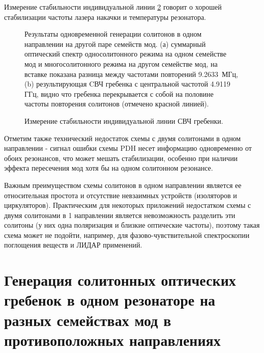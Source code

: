 Измерение стабильности индивидуальной линии \ref{single_line_stability_cp} говорит о хорошей стабилизации частоты лазера накачки и температуры резонатора.

\begin{figure}[ht]
\begin{minipage}[ht]{1\linewidth}
\end{minipage}
\caption{Результаты одновременной генерации солитонов в одном направлении на другой паре семейств мод. (а) суммарный оптический спектр односолитонного режима на одном семействе мод и многосолитонного режима на другом семействе мод, на вставке показана разница между частотами повторений 9.2633~МГц, (b) результирующая CВЧ гребенка с центральной частотой 4.9119 ГГц, видно что гребенка перекрывается с собой на половине частоты повторения солитонов (отмечено красной линией).}
\label{coscheme_different_types}
\end{figure}

\begin{figure}[ht]
\begin{minipage}[ht]{1\linewidth}
\end{minipage}
\caption{Измерение стабильности индивидуальной линии СВЧ гребенки.}
\label{single_line_stability_cp}
\end{figure}

Отметим также технический недостаток схемы с двумя солитонами в одном направлении - сигнал ошибки схемы PDH несет информацию одновременно от обоих резонансов, что может мешать стабилизации, особенно при наличии эффекта пересечения мод хотя бы на одном солитонном резонансе.

Важным преимуществом схемы солитонов в одном направлении является ее относительная простота и отсутствие невзаимных устройств (изоляторов и циркуляторов). Практическим для некоторых приложений недостатком схемы с двумя солитонами в 1 направлении является невозможность разделить эти солитоны (у них одна поляризация и близкие оптические частоты), поэтому такая схема может не подойти, например, для фазово-чувствительной спектроскопии поглощения веществ и ЛИДАР применений.

\section{Генерация солитонных оптических гребенок в одном резонаторе на разных семействах мод в противоположных направлениях}

